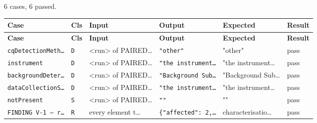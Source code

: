\subsection*{}
{\small 6 cases, 6 passed.}\par
{\small
\begin{xltabular}{\linewidth}{|X|l|l|l|l|l|}
\toprule \textbf{Case} & \textbf{Cls} & \textbf{Input} & \textbf{Output} & \textbf{Expected} & \textbf{Result} \\\midrule\endfirsthead
\toprule \textbf{Case} & \textbf{Cls} & \textbf{Input} & \textbf{Output} & \textbf{Expected} & \textbf{Result} \\\midrule\endhead
\texttt{cqDetectionMeth…} & \texttt{D} & <run> of PAIRED… & \texttt{"other"} & "other" & pass \\
\texttt{instrument} & \texttt{D} & <run> of PAIRED… & \texttt{"the instrument…} & "the instrument… & pass \\
\texttt{backgroundDeter…} & \texttt{D} & <run> of PAIRED… & \texttt{"Background Sub…} & "Background Sub… & pass \\
\texttt{dataCollectionS…} & \texttt{D} & <run> of PAIRED… & \texttt{"the instrument…} & "the instrument… & pass \\
\texttt{notPresent} & \texttt{S} & <run> of PAIRED… & \texttt{""} & "" & pass \\
\texttt{FINDING V-1 — r…} & \texttt{R} & every element t… & \texttt{\{"affected": 2,…} & characterisatio… & pass \\
\bottomrule
\end{xltabular}}


